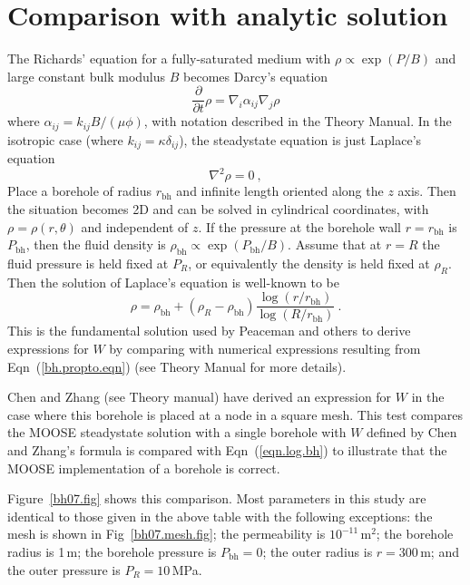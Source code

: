 \documentclass[]{scrreprt}
\begin{document}
\chapter{Comparison with analytic solution}
The Richards' equation for a fully-saturated medium with $\rho \propto
\exp(P/B)$ and large constant bulk modulus $B$ becomes Darcy's equation
\begin{equation}
\frac{\partial}{\partial t}\rho =  \nabla_{i}\alpha_{ij}\nabla_{j}\rho
\end{equation}
where $\alpha_{ij} = k_{ij}B/(\mu\phi)$, with notation described
in the Theory Manual.   In the isotropic case (where $k_{ij} =
\kappa \delta_{ij}$), the steadystate equation is just Laplace's
equation
\begin{equation}
\nabla^{2}\rho = 0 \ ,
\end{equation}
Place a borehole of radius $r_{\mathrm{bh}}$ and infinite length
oriented along the $z$ axis.  Then the situation becomes 2D and can be
solved in cylindrical coordinates, with $\rho=\rho(r,\theta)$ and
independent of $z$.  If the pressure at the borehole wall
$r=r_{\mathrm{bh}}$ is $P_{\mathrm{bh}}$, then the fluid density is
$\rho_{\mathrm{bh}} \propto \exp(P_{\mathrm{bh}}/B)$.  Assume that at
$r=R$ the fluid pressure is held fixed at $P_{R}$, or equivalently the
density is held fixed at $\rho_{R}$.  Then the solution of Laplace's
equation is well-known to be
\begin{equation}
\rho = \rho_{\mathrm{bh}} + (\rho_{R} - \rho_{\mathrm{bh}})
\frac{\log(r/r_{\mathrm{bh}})}{\log(R/r_{\mathrm{bh}})} \ .
\label{eqn.log.bh}
\end{equation}
This is the fundamental solution used by Peaceman and others to derive
expressions for $W$ by comparing with numerical expressions resulting
from Eqn~(\ref{bh.propto.eqn}) (see Theory Manual for more details).

Chen and Zhang (see Theory manual) have derived an expression for $W$
in the case where this borehole is placed at a node in a square mesh.
This test compares the MOOSE steadystate solution with a single
borehole with $W$ defined by 
Chen and Zhang's formula is compared with Eqn~(\ref{eqn.log.bh}) to
illustrate that the MOOSE implementation of a borehole is correct.

Figure~\ref{bh07.fig} shows this comparison.  Most parameters in this
study are identical to those given in the above table with the
following exceptions: the mesh is shown in Fig~\ref{bh07.mesh.fig};
the permeability is $10^{-11}$\,m$^{2}$; the borehole radius is 1\,m;
the borehole pressure is $P_{\mathrm{bh}}=0$; the outer radius is
$r=300$\,m; and the outer pressure is $P_{R}=10$\,MPa.
\end{document}
